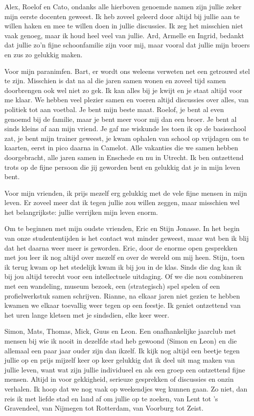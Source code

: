 \documentclass[openright,titlepage,12pt,a4paper]{book}
\begin{document}
Alex, Roelof en Cato, ondanks alle hierboven genoemde namen zijn jullie zeker mijn eerste docenten geweest. Ik heb zoveel geleerd door altijd bij jullie aan te willen haken en mee te willen doen in jullie discussies. Ik zeg het misschien niet vaak genoeg, maar ik houd heel veel van jullie. Ard, Armelle en Ingrid, bedankt dat jullie zo'n fijne schoonfamilie zijn voor mij, maar vooral dat jullie mijn broers en zus zo gelukkig maken.

Voor mijn paranimfen. Bart, er wordt ons weleens verweten net een getrouwd stel te zijn. Misschien is dat na al die jaren samen wonen en zoveel tijd samen doorbrengen ook wel niet zo gek. Ik kan alles bij je kwijt en je staat altijd voor me klaar. We hebben veel plezier samen en voeren altijd discussies over alles, van politiek tot aan voetbal. Je bent mijn beste maat. Roelof, je bent al even genoemd bij de familie, maar je bent meer voor mij dan een broer. Je bent al sinds kleins af aan mijn vriend. Je gaf me wiskunde les toen ik op de basisschool zat, je bent mijn trainer geweest, je kwam ophalen van school op vrijdagen om te kaarten, eerst in pico daarna in Camelot. Alle vakanties die we samen hebben doorgebracht, alle jaren samen in Enschede en nu in Utrecht. Ik ben ontzettend trots op de fijne persoon die jij geworden bent en gelukkig dat je in mijn leven bent.

Voor mijn vrienden, ik prijs mezelf erg gelukkig met de vele fijne mensen in mijn leven. Er zoveel meer dat ik tegen jullie zou willen zeggen, maar misschien wel het belangrijkste: jullie verrijken mijn leven enorm.

Om te beginnen met mijn oudste vrienden, Eric en Stijn Jonasse. In het begin van onze studententijden is het contact wat minder geweest, maar wat ben ik blij dat het daarna weer meer is geworden. Eric, door de enorme open gesprekken met jou leer ik nog altijd over mezelf en over de wereld om mij heen. Stijn, toen ik terug kwam op het stedelijk kwam ik bij jou in de klas. Sinds die dag kan ik bij jou altijd terecht voor een intellectuele uitdaging. Of we die nou combineren met een wandeling, museum bezoek, een (strategisch) spel spelen of een profielwerkstuk samen schrijven. Rianne, na elkaar jaren niet gezien te hebben kwamen we elkaar toevallig weer tegen op een feestje. Ik geniet ontzettend van het uren lange kletsen met je sindsdien, elke keer weer.

Simon, Mats, Thomas, Mick, Guus en Leon. Een onafhankelijke jaarclub met mensen bij wie ik nooit in dezelfde stad heb gewoond (Simon en Leon) en die allemaal een paar jaar ouder zijn dan ikzelf. Ik kijk nog altijd een beetje tegen jullie op en prijs mijzelf keer op keer gelukkig dat ik deel uit mag maken van jullie leven, want wat zijn jullie individueel en als een groep een ontzettend fijne mensen. Altijd in voor gekkigheid, serieuze gesprekken of discussies en onzin verhalen. Ik hoop dat we nog vaak op weekendjes weg kunnen gaan. Zo niet, dan reis ik met liefde stad en land af om jullie op te zoeken, van Lent tot 's Gravendeel, van Nijmegen tot Rotterdam, van Voorburg tot Zeist.
\end{document}
